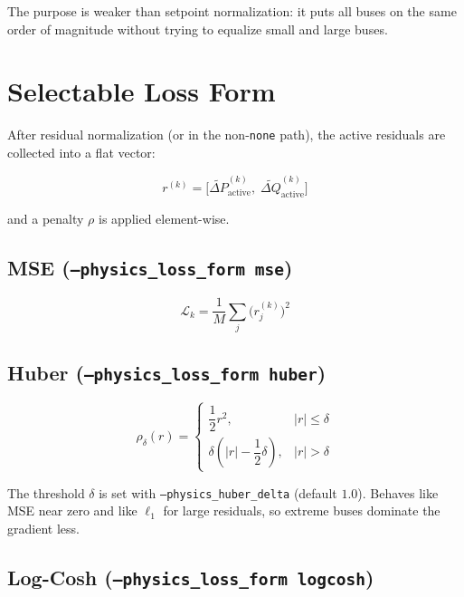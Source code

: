 \documentclass{article}
\begin{document}
The purpose is weaker than setpoint normalization: it puts all buses on the
same order of magnitude without trying to equalize small and large buses.

\section{Selectable Loss Form}

After residual normalization (or in the non-\texttt{none} path), the
active residuals are collected into a flat vector:

\begin{equation}
  r^{(k)}
  =
  \bigl[
    \widetilde{\Delta P}^{(k)}_{\text{active}},\;
    \widetilde{\Delta Q}^{(k)}_{\text{active}}
  \bigr]
\end{equation}

and a penalty $\rho$ is applied element-wise.

\subsection{MSE (\texttt{--physics\_loss\_form mse})}

\begin{equation}
  \mathcal{L}_k = \frac{1}{M}\sum_j \bigl(r_j^{(k)}\bigr)^2
\end{equation}

\subsection{Huber (\texttt{--physics\_loss\_form huber})}

\begin{equation}
  \rho_\delta(r)
  =
  \begin{cases}
    \dfrac{1}{2}r^2, & |r| \le \delta \\[6pt]
    \delta\!\left(|r|-\dfrac{1}{2}\delta\right), & |r| > \delta
  \end{cases}
\end{equation}

The threshold $\delta$ is set with \texttt{--physics\_huber\_delta}
(default $1.0$).  Behaves like MSE near zero and like $\ell_1$ for large
residuals, so extreme buses dominate the gradient less.

\subsection{Log-Cosh (\texttt{--physics\_loss\_form logcosh})}
\end{document}

